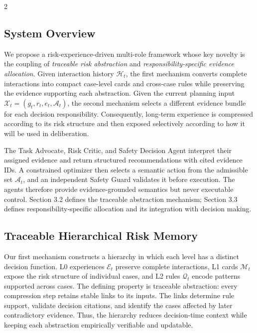 \documentclass[10pt]{article}
\begin{document}
\begin{multicols}{2}
\raggedcolumns

\subsection{System Overview}

We propose a risk-experience-driven multi-role framework whose key novelty is the coupling of \emph{traceable risk abstraction} and \emph{responsibility-specific evidence allocation}. Given interaction history $\mathcal{H}_t$, the first mechanism converts complete interactions into compact case-level cards and cross-case rules while preserving the evidence supporting each abstraction. Given the current planning input $\mathcal{X}_t=(g_t,r_t,e_t,\mathcal{A}_t)$, the second mechanism selects a different evidence bundle for each decision responsibility. Consequently, long-term experience is compressed according to its risk structure and then exposed selectively according to how it will be used in deliberation.

The Task Advocate, Risk Critic, and Safety Decision Agent interpret their assigned evidence and return structured recommendations with cited evidence IDs. A constrained optimizer then selects a semantic action from the admissible set $\mathcal{A}_t$, and an independent Safety Guard validates it before execution. The agents therefore provide evidence-grounded semantics but never executable control. Section 3.2 defines the traceable abstraction mechanism; Section 3.3 defines responsibility-specific allocation and its integration with decision making.

\subsection{Traceable Hierarchical Risk Memory}

Our first mechanism constructs a hierarchy in which each level has a distinct decision function. L0 experiences $\mathcal{E}_t$ preserve complete interactions, L1 cards $\mathcal{M}_t$ expose the risk structure of individual cases, and L2 rules $\mathcal{Q}_t$ encode patterns supported across cases. The defining property is traceable abstraction: every compression step retains stable links to its inputs. The links determine rule support, validate decision citations, and identify the cases affected by later contradictory evidence. Thus, the hierarchy reduces decision-time context while keeping each abstraction empirically verifiable and updatable.


\end{multicols}
\end{document}
